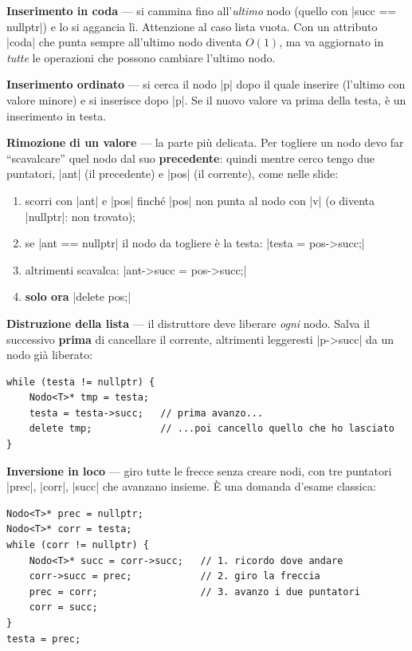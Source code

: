 \textbf{Inserimento in coda} --- si cammina fino all'\emph{ultimo} nodo (quello con
\cc|succ == nullptr|) e lo si aggancia lì. Attenzione al caso lista vuota. Con un
attributo \cc|coda| che punta sempre all'ultimo nodo diventa $O(1)$, ma va aggiornato
in \emph{tutte} le operazioni che possono cambiare l'ultimo nodo.

\textbf{Inserimento ordinato} --- si cerca il nodo \cc|p| dopo il quale inserire
(l'ultimo con valore minore) e si inserisce dopo \cc|p|. Se il nuovo valore va prima
della testa, è un inserimento in testa.

\textbf{Rimozione di un valore} --- la parte più delicata. Per togliere un nodo devo
far ``scavalcare'' quel nodo dal suo \textbf{precedente}: quindi mentre cerco tengo due
puntatori, \cc|ant| (il precedente) e \cc|pos| (il corrente), come nelle slide:
\begin{passopasso}
\begin{enumerate}
  \item scorri con \cc|ant| e \cc|pos| finché \cc|pos| non punta al nodo con \cc|v|
        (o diventa \cc|nullptr|: non trovato);
  \item se \cc|ant == nullptr| il nodo da togliere è la testa: \cc|testa = pos->succ;|
  \item altrimenti scavalca: \cc|ant->succ = pos->succ;|
  \item \textbf{solo ora} \cc|delete pos;|
\end{enumerate}
\end{passopasso}

\textbf{Distruzione della lista} --- il distruttore deve liberare \emph{ogni} nodo.
Salva il successivo \textbf{prima} di cancellare il corrente, altrimenti leggeresti
\cc|p->succ| da un nodo già liberato:
\begin{lstlisting}
while (testa != nullptr) {
    Nodo<T>* tmp = testa;
    testa = testa->succ;   // prima avanzo...
    delete tmp;            // ...poi cancello quello che ho lasciato
}
\end{lstlisting}

\textbf{Inversione in loco} --- giro tutte le frecce senza creare nodi, con tre
puntatori \cc|prec|, \cc|corr|, \cc|succ| che avanzano insieme. È una domanda d'esame
classica:
\begin{lstlisting}
Nodo<T>* prec = nullptr;
Nodo<T>* corr = testa;
while (corr != nullptr) {
    Nodo<T>* succ = corr->succ;   // 1. ricordo dove andare
    corr->succ = prec;            // 2. giro la freccia
    prec = corr;                  // 3. avanzo i due puntatori
    corr = succ;
}
testa = prec;
\end{lstlisting}


